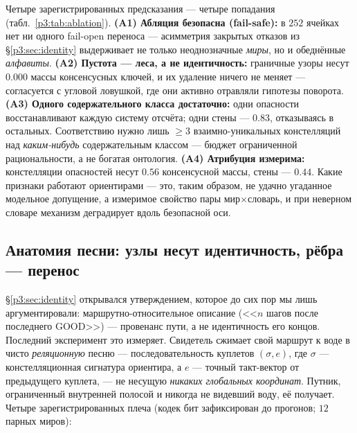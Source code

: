 \documentclass{article}
\begin{document}
Четыре зарегистрированных предсказания --- четыре попадания
(табл.~\ref{p3:tab:ablation}). \textbf{(A1) Абляция безопасна
(fail-safe):} в $252$ ячейках нет ни одного fail-open переноса ---
асимметрия закрытых отказов из \S\ref{p3:sec:identity} выдерживает не
только неоднозначные \emph{миры}, но и обеднённые \emph{алфавиты}.
\textbf{(A2) Пустота --- леса, а не идентичность:} граничные узоры
несут $0.000$ массы консенсусных ключей, и их удаление ничего не
меняет --- согласуется с угловой ловушкой, где они активно отравляли
гипотезы поворота. \textbf{(A3) Одного содержательного класса
достаточно:} одни опасности восстанавливают каждую систему отсчёта;
одни стены --- $0.83$, отказываясь в остальных. Соответствию нужно
лишь $\ge 3$ взаимно-уникальных констелляций над \emph{каким-нибудь}
содержательным классом --- бюджет ограниченной рациональности, а не
богатая онтология. \textbf{(A4) Атрибуция измерима:} констелляции
опасностей несут $0.56$ консенсусной массы, стены --- $0.44$. Какие
признаки работают ориентирами --- это, таким образом, не удачно
угаданное модельное допущение, а измеримое свойство пары
мир$\times$словарь, и при неверном словаре механизм деградирует вдоль
безопасной оси.

\subsection{Анатомия песни: узлы несут идентичность, рёбра --- перенос}
\label{p3:sec:anatomy}

\S\ref{p3:sec:identity} открывался утверждением, которое до сих пор мы
лишь аргументировали: маршрутно-относительное описание (<<$n$ шагов
после последнего GOOD>>) --- провенанс пути, а не идентичность его
концов. Последний эксперимент это измеряет. Свидетель сжимает свой
маршрут к воде в чисто \emph{реляционную} песню --- последовательность
куплетов $(\sigma, e)$, где $\sigma$ --- констелляционная сигнатура
ориентира, а $e$ --- точный такт-вектор от предыдущего куплета, ---
не несущую \emph{никаких глобальных координат}. Путник, ограниченный
внутренней полосой и никогда не видевший воду, её получает. Четыре
зарегистрированных плеча (кодек бит зафиксирован до прогонов; $12$
парных миров):
\end{document}
